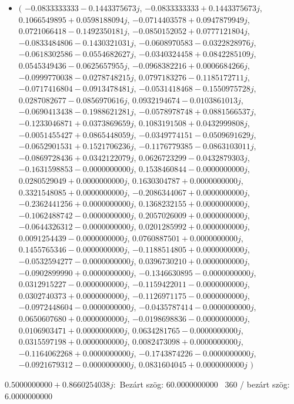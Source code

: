 \documentclass[14pt,a4paper]{article}
\begin{document}
\begin{itemize}
\item
$\big($
$-0.0833333333-0.1443375673j$, $-0.0833333333+0.1443375673j$, $0.1066549895+0.0598188094j$, $-0.0714403578+0.0947879949j$, $0.0721066418-0.1492350181j$, $-0.0850152052+0.0777121804j$, $-0.0833484806-0.1430321031j$, $-0.0608970583-0.0322828976j$, $-0.0618302586-0.0554682627j$, $-0.0340324458+0.0842285109j$, $0.0545349436-0.0625657955j$, $-0.0968382216+0.0006684266j$, $-0.0999770038-0.0278748215j$, $0.0797183276-0.1185172711j$, $-0.0717416804-0.0913478481j$, $-0.0531418468-0.1550975728j$, $0.0287082677-0.0856970616j$, $0.0932194674-0.0103861013j$, $-0.0690413438-0.1988621281j$, $-0.0578978748+0.0881566537j$, $-0.1233046871+0.0373869659j$, $0.1083191508+0.0432999808j$, $-0.0051455427+0.0865448059j$, $-0.0349774151-0.0509691629j$, $-0.0652901531+0.1521706236j$, $-0.1176779385-0.0863103011j$, $-0.0869728436+0.0342122079j$, $0.0626723299-0.0432879303j$, $-0.1631598853-0.0000000000j$, $0.1538460844-0.0000000000j$, $0.0280529049+0.0000000000j$, $0.1630304787+0.0000000000j$, $0.3321548085+0.0000000000j$, $-0.2086344067+0.0000000000j$, $-0.2362441256+0.0000000000j$, $0.1368232155+0.0000000000j$, $-0.1062488742-0.0000000000j$, $0.2057026009+0.0000000000j$, $-0.0644326312-0.0000000000j$, $0.0201285992+0.0000000000j$, $0.0091254439-0.0000000000j$, $0.0760887501+0.0000000000j$, $0.1455765346-0.0000000000j$, $-0.1188514805+0.0000000000j$, $-0.0532594277-0.0000000000j$, $0.0396730210+0.0000000000j$, $-0.0902899990+0.0000000000j$, $-0.1346630895-0.0000000000j$, $0.0312915227-0.0000000000j$, $-0.1159422011-0.0000000000j$, $0.0302740373+0.0000000000j$, $-0.1126971175-0.0000000000j$, $-0.0972448604-0.0000000000j$, $-0.0435787414-0.0000000000j$, $0.0650607680+0.0000000000j$, $-0.0198698836-0.0000000000j$, $0.0106903471+0.0000000000j$, $0.0634281765-0.0000000000j$, $0.0315597198+0.0000000000j$, $0.0082473098+0.0000000000j$, $-0.1164062268+0.0000000000j$, $-0.1743874226-0.0000000000j$, $-0.0921679312-0.0000000000j$, $0.0831604045+0.0000000000j$
$\big)$
\end{itemize}
$0.5000000000+0.8660254038j$:\
Bezárt szög: $60.0000000000$ \
360 / bezárt szög: $6.0000000000$\
\end{document}
